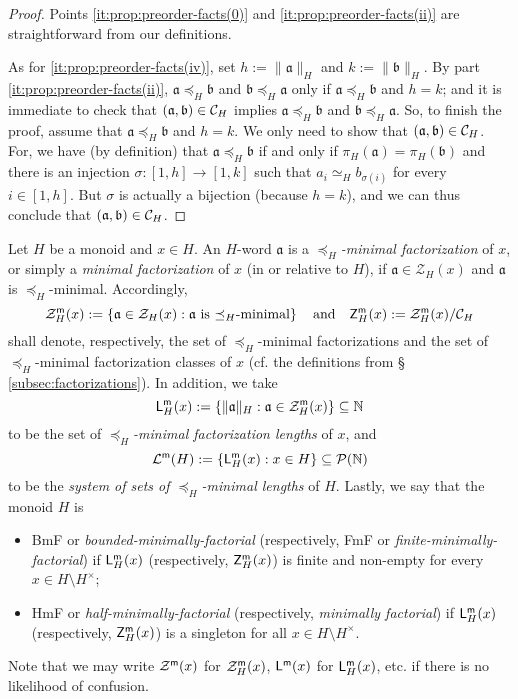 %
\begin{proof}
Points \ref{it:prop:preorder-facts(0)} and \ref{it:prop:preorder-facts(ii)} are straightforward from our definitions.

As for \ref{it:prop:preorder-facts(iv)}, set $h := \|\mathfrak a\|_H$ and $k := \|\mathfrak b\|_H$. 
By part \ref{it:prop:preorder-facts(ii)}, $\mathfrak{a} \preceq_H \mathfrak{b}$ and $\mathfrak{b} \preceq_H \mathfrak{a}$ only if  $\mathfrak a \preceq_H \mathfrak b$ and $h = k$; and it is immediate to check that $(\mathfrak{a},\mathfrak{b}) \in \mathcal{C}_H$ implies $\mathfrak{a} \preceq_H \mathfrak{b}$ and $\mathfrak{b} \preceq_H \mathfrak{a}$. 
So, to finish the proof, assume that $\mathfrak a \preceq_H \mathfrak b$ and $h = k$. We only need to show that $(\mathfrak a, \mathfrak b) \in \mathcal{C}_H$. 
For, we have (by definition) that $\mathfrak a \preceq_H \mathfrak b$ if and only if $\pi_H(\mathfrak a) = \pi_H(\mathfrak b)$ and there is an injection $\sigma: [ 1, h ] \to [ 1, k ]$ 
such that $a_i \simeq_H b_{\sigma(i)}$ for every $i \in [ 1, h ]$. But $\sigma$ is actually a bijection (because $h = k$), and we can thus conclude that $(\mathfrak a, \mathfrak b) \in \mathcal{C}_H$.
\end{proof}
%
\begin{defn}\label{def:min-fac}
Let $H$ be a monoid and $x \in H$. An $H$-word $\mathfrak{a}$ is a \emph{$\preceq_H$-minimal factorization} of $x$, or simply a \emph{minimal factorization} of $x$ (in or relative to $H$), if $\mathfrak a \in \mathcal Z_H(x)$ and $\mathfrak a$ is $\preceq_H$-minimal. Accordingly, 
\[
\mathcal{Z}_{H}^{\mathsf{m}}(x) := \left\{ \mathfrak{a}\in \mathcal{Z}_H(x): \mathfrak{a} \textrm{ is $\preceq_H$-minimal} \right\}
\quad\text{and}\quad
\mathsf{Z}_{H}^{\mathsf{m}}(x):= \mathcal{Z}_{H}^{\mathsf{m}}(x)/\mathcal{C}_H
\]
shall denote, respectively, the set of $\preceq_H$-minimal factorizations and the set of $\preceq_H$-minimal factorization classes of $x$ (cf. the definitions from \S{ }\ref{subsec:factorizations}). In addition, we take 
\[
\mathsf{L}_{H}^{\mathsf{m}}(x) := \left\{ \|\mathfrak{a}\|_H : \mathfrak{a} \in \mathcal{Z}_{H}^{\mathsf{m}}(x) \right\} \subseteq \mathbb{N}
\]
to be the set of \emph{$\preceq_H$-minimal factorization lengths} of $x$, and
\[
	\mathcal{L}^{\mathsf{m}}(H) := \left\{ \mathsf{L}_{H}^{\mathsf{m}}(x) : x\in H \right\} \subseteq \mathcal P(\mathbb{N})
\]
to be the \emph{system of sets of $\preceq_H$-minimal lengths} of $H$. Lastly, we say that the monoid $H$ is
\begin{itemize}
	\item \textup{BmF} or \emph{bounded-minimally-factorial} (respectively, \textup{FmF} or \emph{finite-minimally-factorial}) if $\mathsf{L}_{H}^{\mathsf{m}}(x)$ (respectively, $\mathsf{Z}_{H}^{\mathsf{m}}(x)$) is finite and non-empty for every $x\in H\setminus H^\times$;
	
	\item \textup{HmF} or \emph{half-minimally-factorial} (respectively, \emph{minimally factorial}) if $\mathsf{L}_{H}^{\mathsf{m}}(x)$ (respectively, $\mathsf{Z}_{H}^{\mathsf{m}}(x)$) is a singleton for all $x \in H \setminus H^\times$.
\end{itemize}
%
Note that we may write $\mathcal{Z}^{\mathsf{m}}(x)$ for $\mathcal{Z}_{H}^{\mathsf{m}}(x)$, $\mathsf {L}^{\mathsf{m}}(x)$ for $\mathsf {L}_{H}^{\mathsf{m}}(x)$, etc. if there is no likelihood of confusion.
\end{defn}
%

